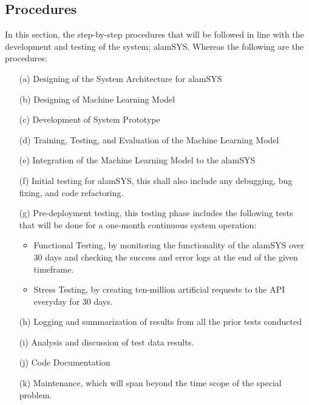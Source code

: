 \subsection{Procedures}
\label{subsec:procedures}
In this section, the step-by-step procedures that 
will be followed in line with the development and testing of the system; 
alamSYS. Whereas the following are the procedures:
\begin{itemize}
    \item[(a)]	Designing of the System Architecture for alamSYS
    \item[(b)]	Designing of Machine Learning Model
    \item[(c)]	Development of System Prototype
    \item[(d)]	Training, Testing, and Evaluation of the Machine Learning Model
    \item[(e)]	Integration of the Machine Learning Model to the alamSYS
    \item[(f)]	Initial testing for alamSYS, this shall also include any debugging, 
    bug fixing, and code refactoring.
    \item[(g)]	Pre-deployment testing, this testing phase includes the 
    following tests that will be done for a one-month continuous system operation:
        \begin{itemize}
            \item Functional Testing, by monitoring the functionality of 
            the alamSYS over 30 days and checking the success and error logs at 
            the end of the given timeframe.
            \item Stress Testing, by creating ten-million artificial requests 
            to the API everyday for 30 days.
        \end{itemize}
    \item[(h)]	Logging and summarization of results from all the prior 
    tests conducted
    \item[(i)]	Analysis and discussion of test data results.
    \item[(j)]	Code Documentation
    \item[(k)]	Maintenance, which will span beyond the time scope of the 
    special problem.
\end{itemize}